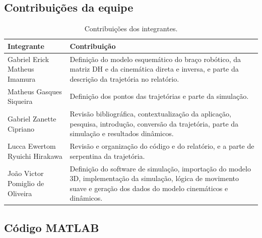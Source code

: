 \subsection{Contribuições da equipe}

\begin{table}[H]
\centering
\small
\caption{Contribuições dos integrantes.}
\begin{tabularx}{\textwidth}{|p{5.0cm}|X|}
\hline
\textbf{Integrante} & \textbf{Contribuição} \\ \hline
Gabriel Erick Matheus Imamura & Definição do modelo esquemático do braço robótico, da matriz DH e da cinemática direta e inversa, e parte da descrição da trajetória no relatório. \\ \hline
Matheus Gasques Siqueira & Definição dos pontos das trajetórias e parte da simulação. \\ \hline
Gabriel Zanette Cipriano & Revisão bibliográfica, contextualização da aplicação, pesquisa, introdução, conversão da trajetória, parte da simulação e resultados dinâmicos. \\ \hline
Lucca Ewertom Ryuichi Hirakawa & Revisão e organização do código e do relatório, e a parte de serpentina da trajetória. \\ \hline
João Victor Pomiglio de Oliveira & Definição do software de simulação, importação do modelo 3D, implementação da simulação, lógica de movimento suave e geração dos dados do modelo cinemáticos e dinâmicos. \\ \hline
\end{tabularx}
\end{table}

\subsection{Código MATLAB}

